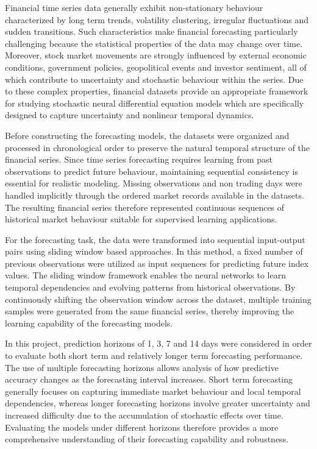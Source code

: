 Financial time series data generally exhibit non-stationary behaviour characterized by long term trends, volatility clustering, irregular fluctuations and sudden transitions. Such characteristics make financial forecasting particularly challenging because the statistical properties of the data may change over time. Moreover, stock market movements are strongly influenced by external economic conditions, government policies, geopolitical events and investor sentiment, all of which contribute to uncertainty and stochastic behaviour within the series. Due to these complex properties, financial datasets provide an appropriate framework for studying stochastic neural differential equation models which are specifically designed to capture uncertainty and nonlinear temporal dynamics.

Before constructing the forecasting models, the datasets were organized and processed in chronological order to preserve the natural temporal structure of the financial series. Since time series forecasting requires learning from past observations to predict future behaviour, maintaining sequential consistency is essential for realistic modeling. Missing observations and non trading days were handled implicitly through the ordered market records available in the datasets. The resulting financial series therefore represented continuous sequences of historical market behaviour suitable for supervised learning applications.

For the forecasting task, the data were transformed into sequential input-output pairs using sliding window based approaches. In this method, a fixed number of previous observations were utilized as input sequences for predicting future index values. The sliding window framework enables the neural networks to learn temporal dependencies and evolving patterns from historical observations. By continuously shifting the observation window across the dataset, multiple training samples were generated from the same financial series, thereby improving the learning capability of the forecasting models.

In this project, prediction horizons of 1, 3, 7 and 14 days were considered in order to evaluate both short term and relatively longer term forecasting performance. The use of multiple forecasting horizons allows analysis of how predictive accuracy changes as the forecasting interval increases. Short term forecasting generally focuses on capturing immediate market behaviour and local temporal dependencies, whereas longer forecasting horizons involve greater uncertainty and increased difficulty due to the accumulation of stochastic effects over time. Evaluating the models under different horizons therefore provides a more comprehensive understanding of their forecasting capability and robustness.


